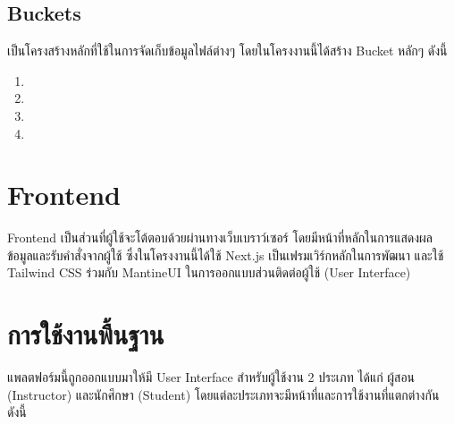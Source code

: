   \subsection{Buckets} เป็นโครงสร้างหลักที่ใช้ในการจัดเก็บข้อมูลไฟล์ต่างๆ โดยในโครงงานนี้ได้สร้าง Bucket หลักๆ ดังนี้
    \begin{enumerate}
      \item 
      \item 
      \item 
      \item 
    \end{enumerate}

\section{Frontend}
  \qquad Frontend เป็นส่วนที่ผู้ใช้จะโต้ตอบด้วยผ่านทางเว็บเบราว์เซอร์ โดยมีหน้าที่หลักในการแสดงผลข้อมูลและรับคำสั่งจากผู้ใช้
  ซึ่งในโครงงานนี้ได้ใช้ Next.js เป็นเฟรมเวิร์กหลักในการพัฒนา และใช้ Tailwind CSS ร่วมกับ MantineUI ในการออกแบบส่วนติดต่อผู้ใช้ (User Interface)

  \section{การใช้งานพื้นฐาน}
    \qquad แพลตฟอร์มนี้ถูกออกแบบมาให้มี User Interface สำหรับผู้ใช้งาน 2 ประเภท ได้แก่ ผู้สอน (Instructor) และนักศึกษา (Student) โดยแต่ละประเภทจะมีหน้าที่และการใช้งานที่แตกต่างกัน ดังนี้
